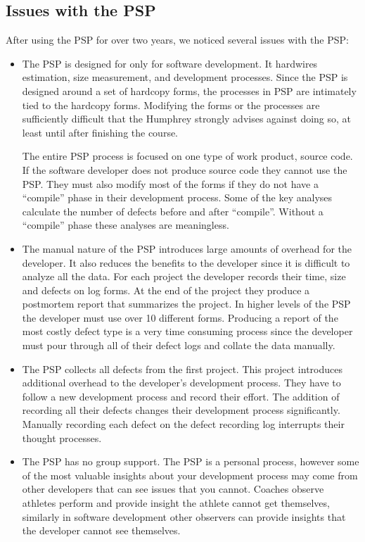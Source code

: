 \subsection{Issues with the PSP}

After using the PSP for over two years, we noticed several issues with the PSP:
\begin{itemize}
\item{The PSP is designed for only for software development. It hardwires
    estimation, size measurement, and development processes. Since the PSP is
    designed around a set of hardcopy forms, the processes in PSP are
    intimately tied to the hardcopy forms.  Modifying the forms or the
    processes are sufficiently difficult that the Humphrey strongly advises
    against doing so, at least until after finishing the course.
    
    The entire PSP process is focused on one type of work product, source code.
    If the software developer does not produce source code they cannot use the
    PSP. They must also modify most of the forms if they do not have a
    ``compile'' phase in their development process.  Some of the key analyses
    calculate the number of defects before and after ``compile''.  Without a
    ``compile'' phase these analyses are meaningless.}
\item{The manual nature of the PSP introduces large amounts of overhead for the
    developer.  It also reduces the benefits to the developer since it is
    difficult to analyze all the data.  For each project the developer records
    their time, size and defects on log forms.  At the end of the project they
    produce a postmortem report that summarizes the project.  In higher levels
    of the PSP the developer must use over 10 different forms.  Producing a
    report of the most costly defect type is a very time consuming process
    since the developer must pour through all of their defect logs and collate
    the data manually.}
\item{The PSP collects all defects from the first project.  This project
    introduces additional overhead to the developer's development process.
    They have to follow a new development process and record their effort.  The
    addition of recording all their defects changes their development process
    significantly.  Manually recording each defect on the defect recording log
    interrupts their thought processes.}
\item{The PSP has no group support. The PSP is a personal process, however some
    of the most valuable insights about your development process may come from
    other developers that can see issues that you cannot.  Coaches observe
    athletes perform and provide insight the athlete cannot get themselves,
    similarly in software development other observers can provide insights that
    the developer cannot see themselves.}
\end{itemize}

